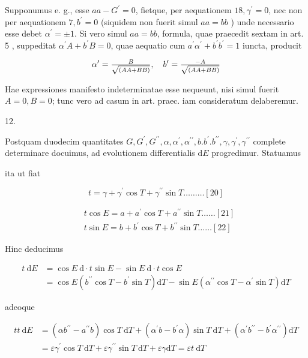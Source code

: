 \documentclass[twoside,12pt, showframe]{memoir}
\let\oldfrac\frac
\def\frac#1#2{\mathchoice{\tfrac{#1}{#2}}{\oldfrac{#1}{#2}}{\genfrac{}{}{}{2}{#1}{#2\mathstrut}}{\genfrac{}{}{}{3}{#1}{#2\mathstrut}}}
\begin{document}
Supponumus e. g., esse \(a a-G^{\prime}=0\), fietque, per aequationem \(18, \gamma^{\prime}=0\), nec non per aequationem \(7, b^{\prime}=0\) (siquidem non fuerit simul \(a a=b b\) ) unde necessario esse debet \(\alpha^{\prime}= \pm 1\). Si vero simul \(a a=b b\), formula, quae praecedit sextam in art. 5 , suppeditat \(\alpha^{\prime} A+b^{\prime} B=0\), quae aequatio cum \(a^{\prime} \alpha^{\prime}+b^{\prime} b^{\prime}=1\) iuncta, producit

\[
\alpha^{\prime}=\frac{B}{\sqrt{(A A+B B)}}, \quad b^{\prime}=\frac{-A}{\sqrt{(A A+B B)}}
\]

Hae expressiones manifesto indeterminatae esse nequeunt, nisi simul fuerit \(A=0, B=0\); tunc vero ad casum in art. praec. iam consideratum delaberemur.

12.

Postquam duodecim quantitates \(G, G^{\prime}, G^{\prime \prime}, \alpha, \alpha^{\prime}, \alpha^{\prime \prime}, b . b^{\prime} . b^{\prime \prime}, \gamma, \gamma^{\prime}, \gamma^{\prime \prime}\) complete determinare docuimus, ad evolutionem differentialis \(\mathrm{d} E\) progredimur. Statuamus

ita ut fiat

\[
t=\gamma+\gamma^{\prime} \cos T+\gamma^{\prime \prime} \sin T \ldots \ldots \ldots[20]
\]

\[
\begin{aligned}
& t \cos E=a+a^{\prime} \cos T+a^{\prime \prime} \sin T \ldots \ldots[21] \\
& t \sin E=b+b^{\prime} \cos T+b^{\prime \prime} \sin T \ldots \ldots[22]
\end{aligned}
\]

Hinc deducimus

\[
\begin{aligned}
t \mathrm{~d} E & =\cos E \mathrm{~d} \cdot t \sin E-\sin E \mathrm{~d} \cdot t \cos E \\
& =\cos E\left(b^{\prime \prime} \cos T-b^{\prime} \sin T\right) \mathrm{d} T-\sin E\left(\alpha^{\prime \prime} \cos T-\alpha^{\prime} \sin T\right) \mathrm{d} T
\end{aligned}
\]

adeoque

\[
\begin{aligned}
t t \mathrm{~d} E & =\left(\alpha b^{\prime \prime}-a^{\prime \prime} b\right) \cos T \mathrm{~d} T+\left(\alpha^{\prime} b-b^{\prime} \alpha\right) \sin T \mathrm{~d} T+\left(\alpha^{\prime} b^{\prime \prime}-b^{\prime} \alpha^{\prime \prime}\right) \mathrm{d} T \\
& =\varepsilon \gamma^{\prime} \cos T \mathrm{~d} T+\varepsilon \gamma^{\prime \prime} \sin T \mathrm{~d} T+\varepsilon \gamma \mathrm{d} T=\varepsilon t \mathrm{~d} T
\end{aligned}
\]
\end{document}
